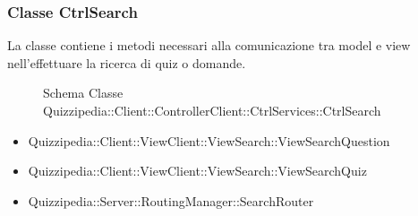 \subsubsection{Classe CtrlSearch}
La classe contiene i metodi necessari alla comunicazione tra model e view nell'effettuare la ricerca di quiz o domande.
\begin{figure}[H]
\centering
\noindent{}
\caption[Schema Classe CtrlSearch]{Schema Classe Quizzipedia::Client::ControllerClient::CtrlServices::CtrlSearch}
\end{figure}
\begin{itemize}
\item Quizzipedia::Client::ViewClient::ViewSearch::ViewSearchQuestion
\item Quizzipedia::Client::ViewClient::ViewSearch::ViewSearchQuiz
\end{itemize}
\begin{itemize}
\item Quizzipedia::Server::RoutingManager::SearchRouter
\end{itemize}
